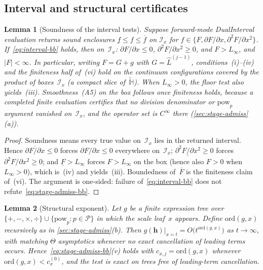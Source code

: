 \documentclass[11pt]{article}
\newcommand{\calI}{\mathcal{I}}
\newcommand{\calP}{\mathcal{P}}
\newcommand{\bbH}{\mathbb{H}}
\newcommand{\Lhat}{\hat{L}}
\theoremstyle{plain}
\newtheorem{lemma}{Lemma}
\theoremstyle{remark}
\begin{document}
\subsection{Interval and structural certificates}\label{sec:cert-lemmas}
\begin{lemma}[Soundness of the interval tests]\label{lem:ia-sound}
Suppose forward-mode DualInterval evaluation returns sound enclosures
$\underline{f}\leq f\leq\overline{f}$ on $\calI_x$ for
$f\in\{F,\partial F/\partial x,\partial^2 F/\partial x^2\}$.
If~\eqref{eq:interval-bb} holds, then on~$\calI_x$:
$\partial F/\partial x\leq 0$, $\partial^2 F/\partial x^2\geq 0$, and $F>L_\infty$,
and $\lvert F\rvert<\infty$.
In particular, writing $F=G+g$ with $G=\Lhat^{(j-1)}$, conditions~(i)--(iv) and the finiteness half of~(vi) hold on the continuum configurations covered by the product of boxes~$\calI_x$ (a compact slice of~$\widetilde{\bbH}$).
When $L_\infty>0$, the floor test also yields~(iii).
Smoothness~(A5) on the box follows once finiteness holds, because a completed finite evaluation certifies that no division denominator or $\mathrm{pow}_p$ argument vanished on~$\calI_x$, and the operator set is $C^\infty$ there (\cref{sec:stage-admiss}(a)).
\end{lemma}

\begin{proof}
Soundness means every true value on~$\calI_x$ lies in the returned interval.
Hence $\overline{\partial F/\partial x}\leq 0$ forces $\partial F/\partial x\leq 0$ everywhere on~$\calI_x$;
$\underline{\partial^2 F/\partial x^2}\geq 0$ forces $\partial^2 F/\partial x^2\geq 0$;
and $\underline{F}>L_\infty$ forces $F>L_\infty$ on the box (hence also $F>0$ when $L_\infty>0$), which is~(iv) and yields~(iii).
Boundedness of~$\overline{F}$ is the finiteness claim of~(vi).
The argument is one-sided: failure of~\eqref{eq:interval-bb} does not refute~\eqref{eq:stage-admiss-bb}.
\end{proof}

\begin{lemma}[Structural exponent]\label{lem:ord}
Let $g$ be a finite expression tree over $\{+,-,\times,\div\}\cup\{\mathrm{pow}_p:p\in\calP\}$ in which the scale leaf~$x$ appears.
Define $\mathrm{ord}(g,x)$ recursively as in \cref{sec:stage-admiss}(b).
Then $g(\mathbf{h})|_{x=t}=O\bigl(t^{\mathrm{ord}(g,x)}\bigr)$ as $t\to\infty$, with matching $\Theta$ asymptotics whenever no exact cancellation of leading terms occurs.
Hence~\eqref{eq:stage-admiss-bb}(v) holds with $c_{x,j}=\mathrm{ord}(g,x)$ whenever $\mathrm{ord}(g,x)<c_x^{(0)}$, and the test is exact on trees free of leading-term cancellation.
\end{lemma}
\end{document}
